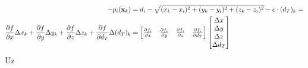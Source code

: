 \documentclass[a4paper,twoside,12pt]{memoir} %
\begin{document}
\begin{align}
- p_i(\mathbf{x}_{k}) &= d_i - \sqrt{(x_k-x_i)^{2}+(y_k-y_i)^{2}+(z_k-z_i)^{2}} - c\cdot (d_T)_k = \notag \\
\frac{\partial f}{\partial x}\Delta x_k + \frac{\partial f}{\partial y}\Delta y_k + \frac{\partial f}{\partial z}\Delta z_k + \frac{\partial f}{\partial d_T}\Delta (d_T)_k &= 
\begin{bmatrix}
\frac{\partial f_i}{\partial x} &
\frac{\partial f_i}{\partial y} &
\frac{\partial f_i}{\partial z} &
\frac{\partial f_i}{\partial d_T}
\end{bmatrix}
\begin{bmatrix}
\Delta x \\
\Delta y \\
\Delta z \\
\Delta d_T
\end{bmatrix}  
\end{align}
Uz 
\end{document}
